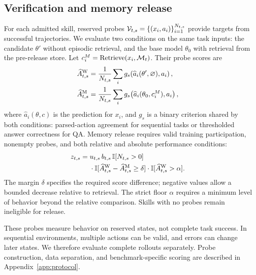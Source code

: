 \subsection{Verification and memory release}
\label{sec:verify}

For each admitted skill, reserved probes
$\mathcal{V}_{t,s}=\{(x_i,a_i)\}_{i=1}^{N_{t,s}}$
provide targets from successful trajectories. We evaluate two conditions on the same task inputs: the candidate $\theta'$ without episodic retrieval, and the base model $\theta_0$ with retrieval from the pre-release store. Let $c_i^M=\operatorname{Retrieve}(x_i,\mathcal{M}_t)$. Their probe scores are
\begin{align}
\widehat A^{\mathrm{W}}_{t,s}
&=\frac{1}{N_{t,s}}\sum_i
g_s\!\left(\widehat a_i(\theta',\varnothing),a_i\right),\\
\widehat A^{\mathrm{M}}_{t,s}
&=\frac{1}{N_{t,s}}\sum_i
g_s\!\left(\widehat a_i(\theta_0,c_i^M),a_i\right),
\label{eq:probe}
\end{align}
where $\widehat a_i(\theta,c)$ is the prediction for $x_i$, and $g_s$ is a binary criterion shared by both conditions: parsed-action agreement for sequential tasks or thresholded answer correctness for QA. Memory release requires valid training participation, nonempty probes, and both relative and absolute performance conditions:
\begin{equation}
\begin{aligned}
z_{t,s}
={}&u_{t,s}\,b_{t,s}\,\mathbb{I}[N_{t,s}>0]\\
&{}\cdot\mathbb{I}[
\widehat A^{\mathrm{W}}_{t,s}
-\widehat A^{\mathrm{M}}_{t,s}\geq\delta]
\cdot\mathbb{I}[\widehat A^{\mathrm{W}}_{t,s}>\alpha].
\end{aligned}
\label{eq:evict}
\end{equation}
The margin $\delta$ specifies the required score difference; negative values allow a bounded decrease relative to retrieval. The strict floor $\alpha$ requires a minimum level of behavior beyond the relative comparison. Skills with no probes remain ineligible for release.

These probes measure behavior on reserved states, not complete task success. In sequential environments, multiple actions can be valid, and errors can change later states. We therefore evaluate complete rollouts separately. Probe construction, data separation, and benchmark-specific scoring are described in Appendix~\ref{app:protocol}.

